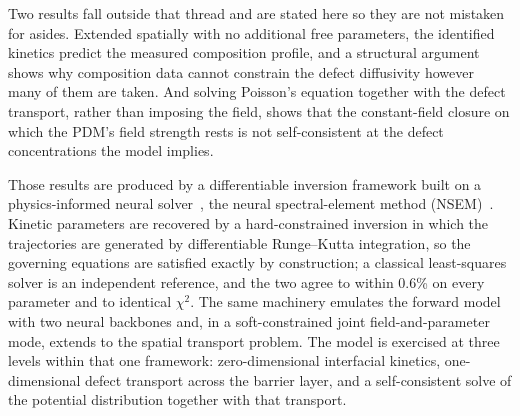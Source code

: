 \documentclass[a4paper,fleqn]{cas-sc}
\begin{document}
Two results fall outside that thread and are stated here so they are not
mistaken for asides. Extended spatially with no additional free
parameters, the identified kinetics predict the measured composition
profile, and a structural argument shows why composition data cannot
constrain the defect diffusivity however many of them are taken. And
solving Poisson's equation together with the defect transport, rather
than imposing the field, shows that the constant-field closure on which
the PDM's field strength rests is not self-consistent at the defect
concentrations the model implies.

Those results are produced by a differentiable inversion framework
built on a physics-informed neural
solver~\citep{raissi2019pinn,karniadakis2021piml}, the neural
spectral-element method (NSEM)~\citep{feugmo2026nsem}. Kinetic parameters
are recovered by a hard-constrained inversion in which the trajectories
are generated by differentiable Runge--Kutta integration, so the
governing equations are satisfied exactly by construction; a classical
least-squares solver is an independent reference, and the two
agree to within 0.6\% on every parameter and to identical $\chi^2$. The
same machinery emulates the forward model with two neural backbones and,
in a soft-constrained joint field-and-parameter mode, extends to the
spatial transport problem. The model is exercised at three levels within
that one framework: zero-dimensional interfacial kinetics, one-dimensional
defect transport across the barrier layer, and a self-consistent solve of
the potential distribution together with that transport.
\end{document}
